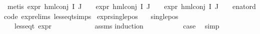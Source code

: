 \begin{isabellebody}
\ {\isacharparenleft}{\kern0pt}metis\ {\isacartoucheopen}expr{\isacharunderscore}{\kern0pt}{}\ {\isacharparenleft}{\kern0pt}hml{\isacharunderscore}{\kern0pt}conj\ I\ J\ {\isasymPhi}{\isacharparenright}{\kern0pt}\ {\isasymle}\ {}{\isacartoucheclose}\ {\isacartoucheopen}expr{\isacharunderscore}{\kern0pt}{}\ {\isacharparenleft}{\kern0pt}hml{\isacharunderscore}{\kern0pt}conj\ I\ J\ {\isasymPhi}{\isacharparenright}{\kern0pt}\ {\isasymle}\ {}{\isacartoucheclose}\ {\isacartoucheopen}expr{\isacharunderscore}{\kern0pt}{}\ {\isacharparenleft}{\kern0pt}hml{\isacharunderscore}{\kern0pt}conj\ I\ J\ {\isasymPhi}{\isacharparenright}{\kern0pt}\ {\isasymle}\ {}{\isacartoucheclose}\ enat{\isacharunderscore}{\kern0pt}ord{\isacharunderscore}{\kern0pt}code{\isacharparenleft}{\kern0pt}{}{\isacharparenright}{\kern0pt}\ expr{\isachardot}{\kern0pt}elims\ less{\isacharunderscore}{\kern0pt}eq{\isacharunderscore}{\kern0pt}t{\isachardot}{\kern0pt}simps{\isacharparenright}{\kern0pt}\isanewline
{}\isamarkupfalse%
%
\endisatagproof
{\isafoldproof}%
%
\isadelimproof
\isanewline
%
\endisadelimproof
\isanewline
{}\isamarkupfalse%
\ expr{\isacharunderscore}{\kern0pt}single{\isacharunderscore}{\kern0pt}pos{\isacharcolon}{\kern0pt}\isanewline
\ \ \ {\isachardoublequoteopen}single{\isacharunderscore}{\kern0pt}pos\ {\isasymphi}{\isachardoublequoteclose}\isanewline
\ \ \ {\isachardoublequoteopen}less{\isacharunderscore}{\kern0pt}eq{\isacharunderscore}{\kern0pt}t\ {\isacharparenleft}{\kern0pt}expr\ {\isasymphi}{\isacharparenright}{\kern0pt}\ {\isacharparenleft}{\kern0pt}{}{\isacharcomma}{\kern0pt}\ {\isasyminfinity}\ {\isacharcomma}{\kern0pt}\ {}{\isacharcomma}{\kern0pt}\ {}{\isacharcomma}{\kern0pt}\ {}{\isacharcomma}{\kern0pt}\ {}{\isacharparenright}{\kern0pt}{\isachardoublequoteclose}\isanewline
%
\isadelimproof
\ \ %
\endisadelimproof
%
\isatagproof
{}\isamarkupfalse%
\ assms\isanewline
{}\isamarkupfalse%
{\isacharparenleft}{\kern0pt}induction\ {\isasymphi}{\isacharparenright}{\kern0pt}\isanewline
\ \ \isamarkupfalse%
\ {}\isanewline
\ \ \isamarkupfalse%
\ \isamarkupfalse%
\ {\isacharquery}{\kern0pt}case\ \isamarkupfalse%
\ simp\isanewline
{}\isamarkupfalse%
\isanewline
\ \ \isamarkupfalse%
\ {\isacharparenleft}{\kern0pt}{}\ {\isasympsi}\ {\isasymalpha}{\isacharparenright}{\kern0pt}\isanewline

\end{isabellebody}
